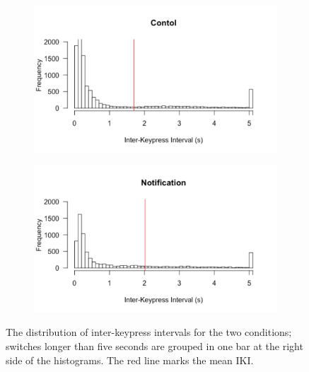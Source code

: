 \begin{figure}
\centering
\begin{subfigure}{0.5\textwidth}
\centerline{\includegraphics[scale=0.5]{images/ch56/ch56-histIKIs_Control.pdf}}
\end{subfigure}
\begin{subfigure}{0.5\textwidth}
\centerline{\includegraphics[scale=0.5]{images/ch56/ch56-histIKIs_Not.pdf}}
\end{subfigure}
\caption{The distribution of inter-keypress intervals for the two conditions; switches longer than five seconds are grouped in one bar at the right side of the histograms. The red line marks the mean IKI.}
\label{fig:ch56-histikis}
\end{figure}

